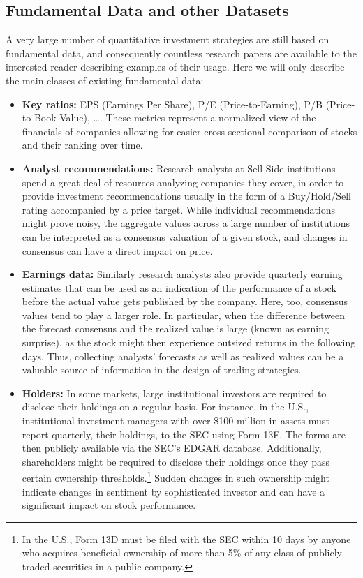 \subsection{Fundamental Data and other Datasets}

A very large number of quantitative investment strategies are still based on fundamental data, and consequently countless research papers are available to the interested reader describing examples of their usage. Here we will only describe the main classes of existing fundamental data:


\begin{itemize}
\item \textbf{Key ratios:} EPS (Earnings Per Share), P/E (Price-to-Earning), P/B (Price-to-Book Value), \dots. These metrics represent a normalized view of the financials of companies allowing for easier cross-sectional comparison of stocks and their ranking over time.


\item \textbf{Analyst recommendations:} Research analysts at Sell Side institutions spend a great deal of resources analyzing companies they cover, in order to provide investment recommendations usually in the form of a Buy/Hold/Sell rating accompanied by a price target. While individual recommendations might prove noisy, the aggregate values across a large number of institutions can be interpreted as a consensus valuation of a given stock, and changes in consensus can have a direct impact on price.


\item \textbf{Earnings data:} Similarly research analysts also provide quarterly earning estimates that can be used as an indication of the performance of a stock before the actual value gets published by the company. Here, too, consensus values tend to play a larger role. In particular, when the difference between the forecast consensus and the realized value is large (known as earning surprise), as the stock might then experience outsized returns in the following days. Thus, collecting analysts' forecasts as well as realized values can be a valuable source of information in the design of trading strategies.


\item \textbf{Holders:} In some markets, large institutional investors are required to disclose their holdings on a regular basis. For instance, in the U.S., institutional investment managers with over \$100 million in assets must report quarterly, their holdings, to the SEC using Form 13F. The forms are then publicly available via the SEC's EDGAR database. Additionally, shareholders might be required to disclose their holdings once they pass certain ownership thresholds.\footnote{In the U.S., Form 13D must be filed with the SEC within 10 days by anyone who acquires beneficial ownership of more than 5\% of any class of publicly traded securities in a public company.} Sudden changes in such ownership might indicate changes in sentiment by sophisticated investor and can have a significant impact on stock performance.



\end{itemize}
